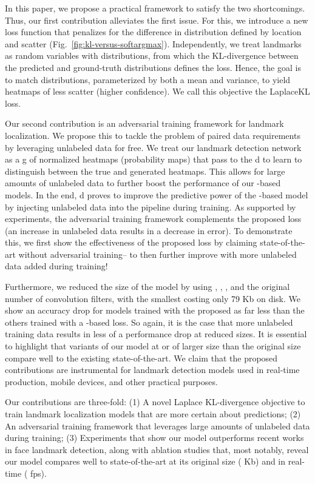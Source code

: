 \documentclass[10pt,twocolumn,letterpaper]{article}
\begin{document}
In this paper, we propose a practical framework to satisfy the two shortcomings. Thus, our first contribution alleviates the first issue. For this, we introduce a new loss function that penalizes for the difference in distribution defined by location and scatter (Fig.~\ref{fig:kl-versus-softargmax}). Independently, we treat landmarks as random variables with  distributions, from which the KL-divergence between the predicted and ground-truth distributions defines the loss. Hence, the goal is to match distributions, parameterized by both a mean and variance, to yield heatmaps of less scatter (\ie higher confidence). We call this objective the LaplaceKL loss.


Our second contribution is an adversarial training framework for landmark localization. We propose this to tackle the problem of paired data requirements by leveraging unlabeled data for free. We treat our landmark detection network as a \gls{g} of normalized heatmaps (\ie probability maps) that pass to the \gls{d} to learn to distinguish between the true and generated heatmaps. This allows for large amounts of unlabeled data to further boost the performance of our -based models. In the end, \gls{d} proves to improve the predictive power of the -based model by injecting unlabeled data into the pipeline during training. As supported by experiments, the adversarial training framework complements the proposed  loss (\ie an increase in unlabeled data results in a decrease in error). To demonstrate this, we first show the effectiveness of the proposed loss by claiming state-of-the-art without adversarial training– to then further improve with more unlabeled data added during training!

Furthermore, we reduced the size of the model by using , , , and  the original number of convolution filters, with the smallest costing only 79 Kb on disk. We show an accuracy drop for models trained with the proposed  as far less than the others trained with a -based loss. So again, it is the case that more unlabeled training data results in less of a performance drop at reduced sizes. It is essential to highlight that variants of our model at or of larger size than  the original size compare well to the existing state-of-the-art. We claim that the proposed contributions are instrumental for landmark detection models used in real-time production, mobile devices, and other practical purposes.

Our contributions are three-fold: (1) A novel Laplace KL-divergence objective to train landmark localization models that are more certain about predictions; (2) An adversarial training framework that leverages large amounts of unlabeled data during training; (3) Experiments that show our model outperforms recent works in face landmark detection, along with ablation studies that, most notably, reveal our model compares well to state-of-the-art at  its original size ( Kb) and in real-time ( fps).
\end{document}
